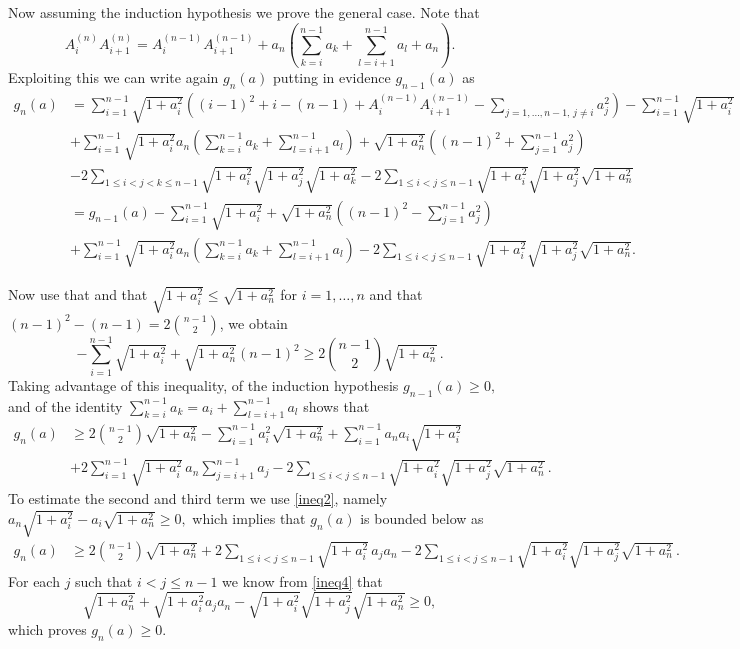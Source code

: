 \documentclass[10pt,leqno]{amsart}
\makeatletter
\numberwithin{Theorem}{section}
\theoremstyle{definition}
\theoremstyle{remark}
\numberwithin{equation}{section}
\numberwithin{equation}{section}
\newenvironment{customproof}[1]{%
  \par\pushQED{\qed}%
  \normalfont\topsep6pt \trivlist
  \item[\hskip\labelsep\itshape
    Proof of #1\@addpunct{.}]\ignorespaces
}{%
  \popQED\endtrivlist\@endpefalse
}
\makeatother
\begin{document}
\begin{customproof}{Theorem \ref{lm:quad_lemma_p=2}}
Now assuming the induction hypothesis we prove the general case. Note that
\[
A_i^{(n)} A_{i+1}^{(n)} = A_i^{(n-1)} A_{i+1}^{(n-1)} + a_n\left(  \sum_{k=i}^{n-1} a_k +\sum_{l=i+1}^{n-1} a_l + a_n \right).
\]
Exploiting this we can write again $g_n(a)$ putting in evidence $g_{n-1}(a)$ as
\begin{align*}
    g_n(a) &= \sum_{i=1}^{n-1} \sqrt{1+a_i^2} \left(  (i-1)^2 +i - (n-1) + A_i^{(n-1)} A_{i+1}^{(n-1)} - \sum_{j=1,\dots,n-1, \,j\neq i} a_j^2 \right) -\sum_{i=1}^{n-1}\sqrt{1+a_i^2} \\
    &+ \sum_{i=1}^{n-1} \sqrt{1+a_i^2} a_n \left( \sum_{k=i}^{n-1}a_k + \sum_{l=i+1}^{n-1} a_l \right) + \sqrt{1+a_n^2} \left((n-1)^2 + \sum_{j=1}^{n-1}a_j^2 \right) \\
    & - 2 \sum_{1 \leq i <j<k \leq n-1} \sqrt{1+a_i^2} \sqrt{1+a_j^2} \sqrt{1+a_k^2} - 2 \sum_{1 \leq i <j\leq n-1} \sqrt{1+a_i^2} \sqrt{1+a_j^2}  \sqrt{1+a_n^2} \\
    &= g_{n-1}(a)  -\sum_{i=1}^{n-1}\sqrt{1+a_i^2} +   \sqrt{1+a_n^2} \left((n-1)^2 - \sum_{j=1}^{n-1}a_j^2 \right)  \\
    &+  \sum_{i=1}^{n-1} \sqrt{1+a_i^2} a_n \left( \sum_{k=i}^{n-1}a_k + \sum_{l=i+1}^{n-1} a_l \right) - 2 \sum_{1 \leq i <j\leq n-1} \sqrt{1+a_i^2} \sqrt{1+a_j^2}  \sqrt{1+a_n^2}.
 \end{align*}

Now use that and that $\sqrt{1+a_i^2} \leq \sqrt{1+a_n^2}$ for $i=1,\dots,n$ and that $(n-1)^2-(n-1) = 2 \binom{n-1}{2}$, we obtain 
$$
   -\sum_{i=1}^{n-1}\sqrt{1+a_i^2} +   \sqrt{1+a_n^2} (n-1)^2\geq 2 \binom{n-1}{2} \sqrt{1+a_n^2}\,.
$$
Taking advantage of this inequality, of the induction hypothesis $g_{n-1}(a)\geq 0,$ and of the identity $\sum_{k=i}^{n-1}a_k=a_i+\sum_{l=i+1}^{n-1}a_l$ shows that
 \begin{align*}
     g_n(a) &\geq 2 \binom{n-1}{2} \sqrt{1+a_n^2} -  \sum_{i=1}^{n-1} a_i^2 \sqrt{1+a_n^2}   + \sum_{i=1}^{n-1}a_n a_i \sqrt{1+a_i^2}  \\
     &+ 2 \sum_{i=1}^{n-1} \sqrt{1+a_i^2} \, a_n \sum_{j=i+1}^{n-1} a_j  - 2   \sum_{1 \leq i <j\leq n-1} \sqrt{1+a_i^2} \sqrt{1+a_j^2}  \sqrt{1+a_n^2}\,.
\end{align*}
To estimate the second and third term we use \eqref{ineq2}, namely $a_n\sqrt{1+a_i^2}-a_i\sqrt{1+a_n^2}\geq 0,$   which implies that $g_n(a)$ is bounded below as 
\begin{align*}
      g_n(a) &\geq  2 \binom{n-1}{2} \sqrt{1+a_n^2} + 2 \sum_{1\leq i <j \leq n-1} \sqrt{1+a_i^2} \, a_j a_n   - 2   \sum_{1 \leq i <j\leq n-1} \sqrt{1+a_i^2} \sqrt{1+a_j^2}  \sqrt{1+a_n^2}\,.
 \end{align*}
 For each $j$ such that $i < j \leq n-1$ we know from \eqref{ineq4}  that
 \[
 \sqrt{1+a_n^2} + \sqrt{1+a_i^2} a_j a_n - \sqrt{1+a_i^2} \sqrt{1+a_j^2}  \sqrt{1+a_n^2} \geq 0,
 \]
which proves $g_n(a) \geq 0$.

\end{customproof}
\end{document}
